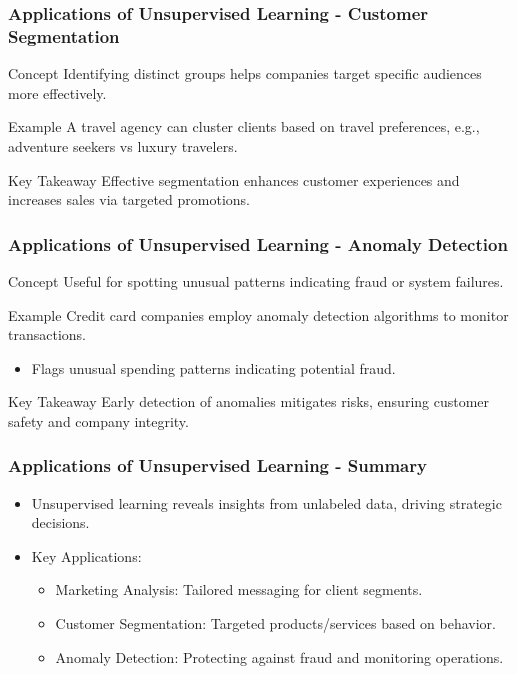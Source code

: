 \documentclass[aspectratio=169]{beamer}
\begin{document}
\begin{frame}[fragile]
    \frametitle{Applications of Unsupervised Learning - Customer Segmentation}
    \begin{block}{Concept}
        Identifying distinct groups helps companies target specific audiences more effectively.
    \end{block}

    \begin{block}{Example}
        A travel agency can cluster clients based on travel preferences, e.g., adventure seekers vs luxury travelers.
    \end{block}
    
    \begin{block}{Key Takeaway}
        Effective segmentation enhances customer experiences and increases sales via targeted promotions.
    \end{block}
\end{frame}

\begin{frame}[fragile]
    \frametitle{Applications of Unsupervised Learning - Anomaly Detection}
    \begin{block}{Concept}
        Useful for spotting unusual patterns indicating fraud or system failures.
    \end{block}

    \begin{block}{Example}
        Credit card companies employ anomaly detection algorithms to monitor transactions.
        \begin{itemize}
            \item Flags unusual spending patterns indicating potential fraud.
        \end{itemize}
    \end{block}

    \begin{block}{Key Takeaway}
        Early detection of anomalies mitigates risks, ensuring customer safety and company integrity.
    \end{block}
\end{frame}

\begin{frame}[fragile]
    \frametitle{Applications of Unsupervised Learning - Summary}
    \begin{itemize}
        \item Unsupervised learning reveals insights from unlabeled data, driving strategic decisions.
        \item Key Applications:
        \begin{itemize}
            \item Marketing Analysis: Tailored messaging for client segments.
            \item Customer Segmentation: Targeted products/services based on behavior.
            \item Anomaly Detection: Protecting against fraud and monitoring operations.
        \end{itemize}
    \end{itemize}
\end{frame}
\end{document}

